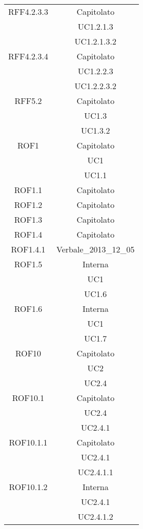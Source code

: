 \begin{longtable}{|c|c|}
\midrule
RFF4.2.3.3
& Capitolato\\
& UC1.2.1.3\\
& UC1.2.1.3.2\\

\midrule
RFF4.2.3.4
& Capitolato\\
& UC1.2.2.3\\
& UC1.2.2.3.2\\

\midrule
RFF5.2
& Capitolato\\
& UC1.3\\
& UC1.3.2\\

\midrule
ROF1
& Capitolato\\
& UC1\\
& UC1.1\\

\midrule
ROF1.1
& Capitolato\\

\midrule
ROF1.2
& Capitolato\\

\midrule
ROF1.3
& Capitolato\\

\midrule
ROF1.4
& Capitolato\\

\midrule
ROF1.4.1
& Verbale\_2013\_12\_05\\

\midrule
ROF1.5
& Interna\\
& UC1\\
& UC1.6\\

\midrule
ROF1.6
& Interna\\
& UC1\\
& UC1.7\\

\midrule
ROF10
& Capitolato\\
& UC2\\
& UC2.4\\

\midrule
ROF10.1
& Capitolato\\
& UC2.4\\
& UC2.4.1\\

\midrule
ROF10.1.1
& Capitolato\\
& UC2.4.1\\
& UC2.4.1.1\\

\midrule
ROF10.1.2
& Interna\\
& UC2.4.1\\
& UC2.4.1.2\\


\end{longtable}

